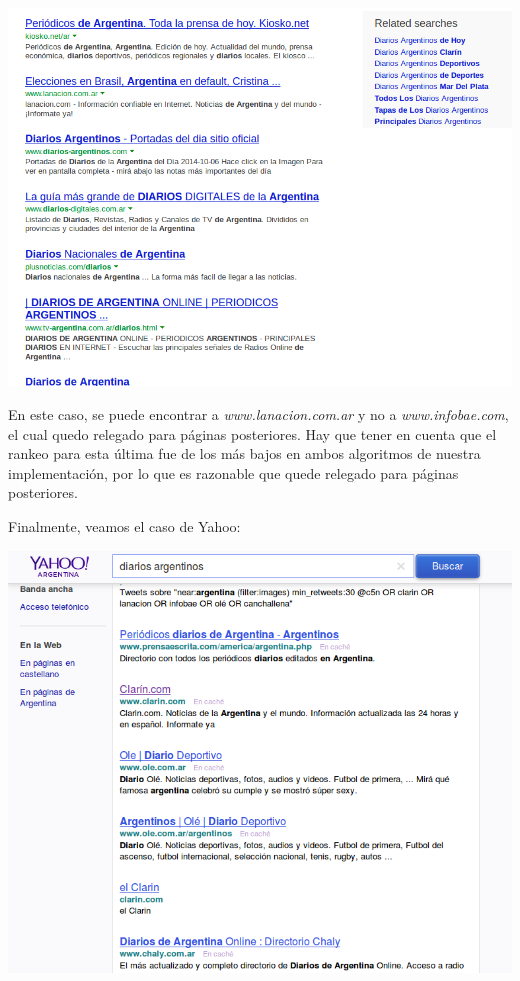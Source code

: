 	\par 
	\begin{center}
		\includegraphics[scale=0.5]{./img/segundapaginabing.png}
	\end{center}
	\par
En este caso, se puede encontrar a \textit{www.lanacion.com.ar} y no a \textit{www.infobae.com}, el cual quedo relegado para páginas posteriores. Hay que tener en cuenta que el rankeo para esta última fue de los más bajos en ambos algoritmos de nuestra implementación, por lo que es razonable que quede relegado para páginas posteriores.
\par 

Finalmente, veamos el caso de Yahoo:

	\par 
	\begin{center}
		\includegraphics[scale=0.5]{./img/primerapaginayahoo.png}
	\end{center}
	\par
	
